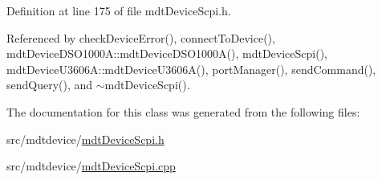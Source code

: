 Definition at line 175 of file mdt\-Device\-Scpi.\-h.



Referenced by check\-Device\-Error(), connect\-To\-Device(), mdt\-Device\-D\-S\-O1000\-A\-::mdt\-Device\-D\-S\-O1000\-A(), mdt\-Device\-Scpi(), mdt\-Device\-U3606\-A\-::mdt\-Device\-U3606\-A(), port\-Manager(), send\-Command(), send\-Query(), and $\sim$mdt\-Device\-Scpi().



The documentation for this class was generated from the following files\-:\begin{DoxyCompactItemize}
\item 
src/mdtdevice/\hyperlink{mdt_device_scpi_8h}{mdt\-Device\-Scpi.\-h}\item 
src/mdtdevice/\hyperlink{mdt_device_scpi_8cpp}{mdt\-Device\-Scpi.\-cpp}\end{DoxyCompactItemize}
